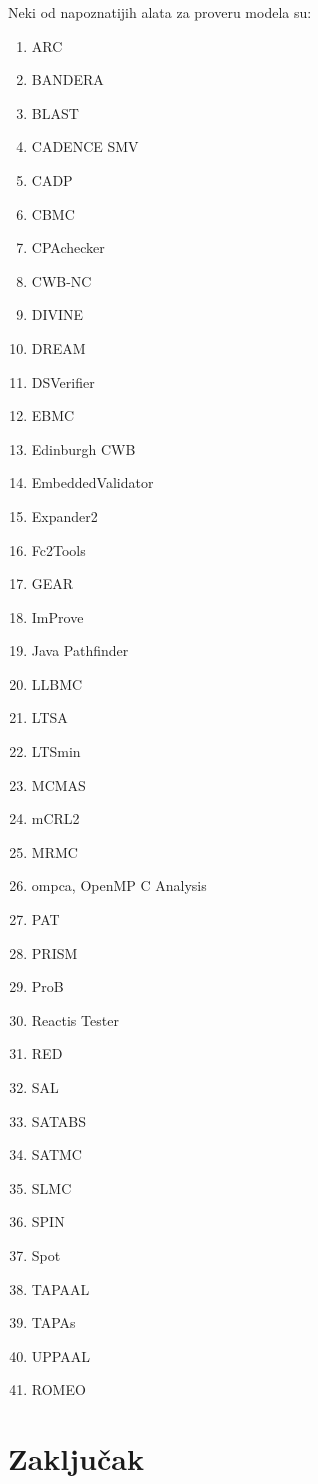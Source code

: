 \documentclass[a4paper]{article}
\begin{document}
{Neki od napoznatijih alata za proveru modela su:
\begin{enumerate}
\item ARC
\item BANDERA
\item BLAST
\item CADENCE SMV
\item CADP
\item CBMC
\item CPAchecker
\item CWB-NC
\item DIVINE
\item DREAM
\item DSVerifier
\item EBMC
\item Edinburgh CWB
\item EmbeddedValidator
\item Expander2
\item Fc2Tools
\item GEAR
\item ImProve
\item Java Pathfinder
\item LLBMC
\item LTSA
\item LTSmin
\item MCMAS
\item mCRL2
\item MRMC
\item ompca, OpenMP C Analysis
\item PAT
\item PRISM
\item ProB
\item Reactis Tester
\item RED
\item SAL
\item SATABS
\item SATMC
\item SLMC
\item SPIN
\item Spot
\item TAPAAL
\item TAPAs
\item UPPAAL
\item ROMEO
\end{enumerate}

	\section{Zaključak}
	\label{sec:zakljucak}

}
\end{document}
